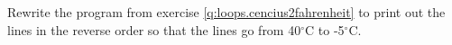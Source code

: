 Rewrite the program from exercise \ref{q:loops.cencius2fahrenheit} to print out the lines in the reverse order so that the lines go from 40$^\circ$C to -5$^\circ$C.
